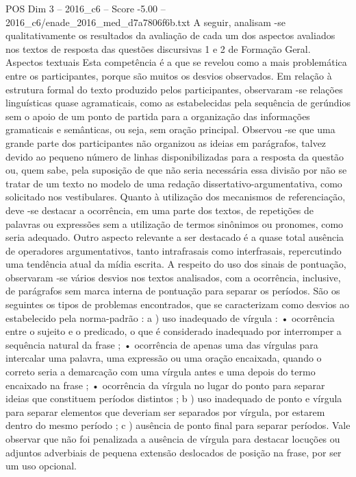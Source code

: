 \begin{textsample}{POS Dim 3 – 2016\_c6 – Score -5.00 – 2016\_c6/enade\_2016\_med\_d7a7806f6b.txt}
A seguir, analisam -se qualitativamente os resultados da avaliação de cada um dos aspectos avaliados nos textos de resposta das questões discursivas 1 e 2 de Formação Geral.
Aspectos textuais Esta competência é a que se revelou como a mais problemática entre os participantes, porque são muitos os desvios observados.
Em relação à estrutura formal do texto produzido pelos participantes, observaram -se relações linguísticas quase agramaticais, como as estabelecidas pela sequência de gerúndios sem o apoio de um ponto de partida para a organização das informações gramaticais e semânticas, ou seja, sem oração principal.
Observou -se que uma grande parte dos participantes não organizou as ideias em parágrafos, talvez devido ao pequeno número de linhas disponibilizadas para a resposta da questão ou, quem sabe, pela suposição de que não seria necessária essa divisão por não se tratar de um texto no modelo de uma redação dissertativo-argumentativa, como solicitado nos vestibulares.
Quanto à utilização dos mecanismos de referenciação, deve -se destacar a ocorrência, em uma parte dos textos, de repetições de palavras ou expressões sem a utilização de termos sinônimos ou pronomes, como seria adequado.
Outro aspecto relevante a ser destacado é a quase total ausência de operadores argumentativos, tanto intrafrasais como interfrasais, repercutindo uma tendência atual da mídia escrita.
A respeito do uso dos sinais de pontuação, observaram -se vários desvios nos textos analisados, com a ocorrência, inclusive, de parágrafos sem marca interna de pontuação para separar os períodos.
São os seguintes os tipos de problemas encontrados, que se caracterizam como desvios ao estabelecido pela norma-padrão : a ) uso inadequado de vírgula : • ocorrência entre o sujeito e o predicado, o que é considerado inadequado por interromper a sequência natural da frase ; • ocorrência de apenas uma das vírgulas para intercalar uma palavra, uma expressão ou uma oração encaixada, quando o correto seria a demarcação com uma vírgula antes e uma depois do termo encaixado na frase ; • ocorrência da vírgula no lugar do ponto para separar ideias que constituem períodos distintos ; b ) uso inadequado de ponto e vírgula para separar elementos que deveriam ser separados por vírgula, por estarem dentro do mesmo período ; c ) ausência de ponto final para separar períodos.
Vale observar que não foi penalizada a ausência de vírgula para destacar locuções ou adjuntos adverbiais de pequena extensão deslocados de posição na frase, por ser um uso opcional.

\end{textsample}
